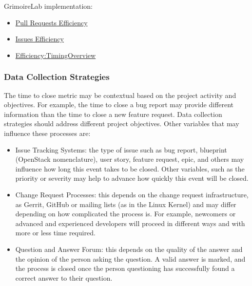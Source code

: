 GrimoireLab implementation:

\begin{itemize}
\tightlist
\item
  \href{https://chaoss.github.io/grimoirelab-sigils/panels/github-pullrequests-efficiency/}{Pull
  Requests Efficiency}\\
\item
  \href{https://chaoss.github.io/grimoirelab-sigils/panels/github-issues-efficiency/}{Issues
  Efficiency}\\
\item
  \href{https://chaoss.github.io/grimoirelab-sigils/panels/efficiency-timing-overview/}{Efficiency:TimingOverview}
\end{itemize}

\hypertarget{data-collection-strategies}{%
\subsubsection{Data Collection
Strategies}\label{data-collection-strategies}}

The time to close metric may be contextual based on the project activity
and objectives. For example, the time to close a bug report may provide
different information than the time to close a new feature request. Data
collection strategies should address different project objectives. Other
variables that may influence these processes are:

\begin{itemize}
\tightlist
\item
  Issue Tracking Systems: the type of issue such as bug report,
  blueprint (OpenStack nomenclature), user story, feature request, epic,
  and others may influence how long this event takes to be closed. Other
  variables, such as the priority or severity may help to advance how
  quickly this event will be closed.\\
\item
  Change Request Processes: this depends on the change request
  infrastructure, as Gerrit, GitHub or mailing lists (as in the Linux
  Kernel) and may differ depending on how complicated the process is.
  For example, newcomers or advanced and experienced developers will
  proceed in different ways and with more or less time required.\\
\item
  Question and Answer Forum: this depends on the quality of the answer
  and the opinion of the person asking the question. A valid answer is
  marked, and the process is closed once the person questioning has
  successfully found a correct answer to their question.
\end{itemize}

